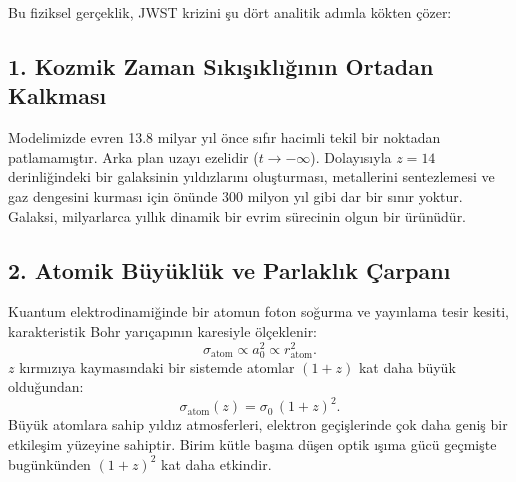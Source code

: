\documentclass[11pt,a4paper]{article}
\begin{document}
Bu fiziksel gerçeklik, JWST krizini şu dört analitik adımla kökten çözer:

\subsection{1. Kozmik Zaman Sıkışıklığının Ortadan Kalkması}
Modelimizde evren 13.8 milyar yıl önce sıfır hacimli tekil bir noktadan patlamamıştır. Arka plan uzayı ezelidir ($t \to -\infty$). Dolayısıyla $z = 14$ derinliğindeki bir galaksinin yıldızlarını oluşturması, metallerini sentezlemesi ve gaz dengesini kurması için önünde 300 milyon yıl gibi dar bir sınır yoktur. Galaksi, milyarlarca yıllık dinamik bir evrim sürecinin olgun bir ürünüdür.

\subsection{2. Atomik Büyüklük ve Parlaklık Çarpanı}
Kuantum elektrodinamiğinde bir atomun foton soğurma ve yayınlama tesir kesiti, karakteristik Bohr yarıçapının karesiyle ölçeklenir:
\begin{equation}
    \sigma_{\mathrm{atom}} \propto a_0^2 \propto r_{\mathrm{atom}}^2.
\end{equation}
$z$ kırmızıya kaymasındaki bir sistemde atomlar $(1+z)$ kat daha büyük olduğundan:
\begin{equation}
    \sigma_{\mathrm{atom}}(z) = \sigma_0 \, (1+z)^2.
\end{equation}
Büyük atomlara sahip yıldız atmosferleri, elektron geçişlerinde çok daha geniş bir etkileşim yüzeyine sahiptir. Birim kütle başına düşen optik ışıma gücü geçmişte bugünkünden $(1+z)^2$ kat daha etkindir.
\end{document}

